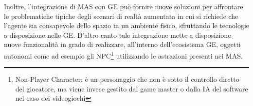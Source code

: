 \medskip

Inoltre, l'integrazione di MAS con GE può fornire nuove soluzioni per affrontare le problematiche tipiche degli scenari di realtà aumentata in cui si richiede che l'agente sia consapevole dello spazio in un ambiente fisico, sfruttando le tecnologie a disposizione nelle GE. D'altro canto tale integrazione mette a disposizione nuove funzionalità in grado di realizzare, all'interno dell'ecosistema GE, oggetti autonomi come ad esempio gli NPC\footnote{Non-Player Character: è un personaggio che non è sotto il controllo diretto del giocatore, ma viene invece gestito dal game master o dalla IA del software nel caso dei videogiochi} utilizzando le astrazioni presenti nei MAS.